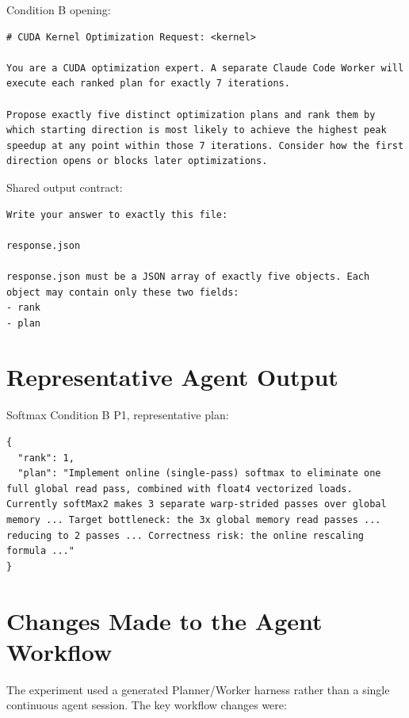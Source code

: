\documentclass[conference]{IEEEtran}
\begin{document}
Condition B opening:
\begin{lstlisting}
# CUDA Kernel Optimization Request: <kernel>

You are a CUDA optimization expert. A separate Claude Code Worker will execute each ranked plan for exactly 7 iterations.

Propose exactly five distinct optimization plans and rank them by which starting direction is most likely to achieve the highest peak speedup at any point within those 7 iterations. Consider how the first direction opens or blocks later optimizations.
\end{lstlisting}

Shared output contract:
\begin{lstlisting}
Write your answer to exactly this file:

response.json

response.json must be a JSON array of exactly five objects. Each object may contain only these two fields:
- rank
- plan
\end{lstlisting}

\section{Representative Agent Output}

Softmax Condition B P1, representative plan:
\begin{lstlisting}
{
  "rank": 1,
  "plan": "Implement online (single-pass) softmax to eliminate one full global read pass, combined with float4 vectorized loads. Currently softMax2 makes 3 separate warp-strided passes over global memory ... Target bottleneck: the 3x global memory read passes ... reducing to 2 passes ... Correctness risk: the online rescaling formula ..."
}
\end{lstlisting}

\section{Changes Made to the Agent Workflow}

The experiment used a generated Planner/Worker harness rather than a single
continuous agent session. The key workflow changes were:
\end{document}
